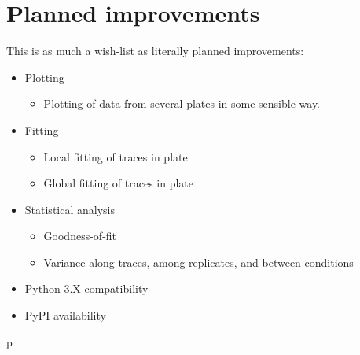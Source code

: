 \documentclass[letterpaper,10pt,english]{sphinxmanual}
\begin{document}
\section{Planned improvements}
\label{\detokenize{contribute:planned-improvements}}
This is as much a wish-list as literally planned improvements:
\begin{itemize}
\item {} 
Plotting
\begin{itemize}
\item {} 
Plotting of data from several plates in some sensible way.

\end{itemize}

\item {} 
Fitting
\begin{itemize}
\item {} 
Local fitting of traces in plate

\item {} 
Global fitting of traces in plate

\end{itemize}

\item {} 
Statistical analysis
\begin{itemize}
\item {} 
Goodness-of-fit

\item {} 
Variance along traces, among replicates, and between conditions

\end{itemize}

\item {} 
Python 3.X compatibility

\item {} 
PyPI availability

\end{itemize}


\renewcommand{\indexname}{Python Module Index}
\begin{sphinxtheindex}
\def\bigletter#1{{\Large\sffamily#1}\nopagebreak\vspace{1mm}}
\bigletter{p}
\item {}
\item {}
\item {}
\end{sphinxtheindex}

\renewcommand{\indexname}{Index}
\printindex
\end{document}
